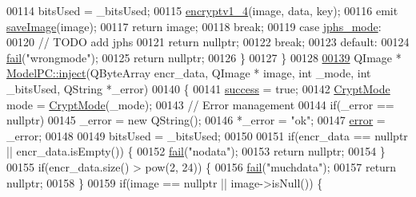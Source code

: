 \begin{DoxyCode}
00114             bitsUsed = \_bitsUsed;
00115             \hyperlink{class_model_p_c_a4daefc3fb87a1f19172b9b20c987eb12}{encryptv1\_4}(image, data, key);
00116             emit \hyperlink{class_model_p_c_a41f5e2e8022679046e4d3fa1109025fa}{saveImage}(image);
00117             \textcolor{keywordflow}{return} image;
00118         \textcolor{keywordflow}{break};
00119         \textcolor{keywordflow}{case} \hyperlink{class_model_p_c_a296dd7afe3e1c49b3da25fd644fe4ceba90ca32d3ccbb6be224cdfc33f7096eea}{jphs\_mode}:
00120             \textcolor{comment}{// TODO add jphs}
00121             \textcolor{keywordflow}{return} \textcolor{keyword}{nullptr};
00122         \textcolor{keywordflow}{break};
00123         \textcolor{keywordflow}{default}:
00124             \hyperlink{class_model_p_c_a47464b59b7e37fcee25e55475708aabd}{fail}(\textcolor{stringliteral}{"wrongmode"});
00125             \textcolor{keywordflow}{return} \textcolor{keyword}{nullptr};
00126     \}
00127 \}
00128 
\hypertarget{modelpc_8cpp_source.tex_l00139}{}\hyperlink{class_model_p_c_aada6a04d81ada8f2b4ba18108c8d6f10}{00139} QImage * \hyperlink{class_model_p_c_aada6a04d81ada8f2b4ba18108c8d6f10}{ModelPC::inject}(QByteArray encr\_data, QImage * image, \textcolor{keywordtype}{int} \_mode, \textcolor{keywordtype}{int} \_bitsUsed, 
      QString *\_error)
00140 \{
00141     \hyperlink{class_model_p_c_a945ffbbc44a832b953c191debd448f4c}{success} = \textcolor{keyword}{true};
00142     \hyperlink{class_model_p_c_a296dd7afe3e1c49b3da25fd644fe4ceb}{CryptMode} mode = \hyperlink{class_model_p_c_a296dd7afe3e1c49b3da25fd644fe4ceb}{CryptMode}(\_mode);
00143     \textcolor{comment}{// Error management}
00144     \textcolor{keywordflow}{if}(\_error == \textcolor{keyword}{nullptr})
00145         \_error = \textcolor{keyword}{new} QString();
00146     *\_error = \textcolor{stringliteral}{"ok"};
00147     \hyperlink{class_model_p_c_a4e5a9c0ca1f06fe5bc478b6bf248c37c}{error} = \_error;
00148 
00149     bitsUsed = \_bitsUsed;
00150 
00151     \textcolor{keywordflow}{if}(encr\_data == \textcolor{keyword}{nullptr} || encr\_data.isEmpty()) \{
00152         \hyperlink{class_model_p_c_a47464b59b7e37fcee25e55475708aabd}{fail}(\textcolor{stringliteral}{"nodata"});
00153         \textcolor{keywordflow}{return} \textcolor{keyword}{nullptr};
00154     \}
00155     \textcolor{keywordflow}{if}(encr\_data.size() > pow(2, 24)) \{
00156         \hyperlink{class_model_p_c_a47464b59b7e37fcee25e55475708aabd}{fail}(\textcolor{stringliteral}{"muchdata"});
00157         \textcolor{keywordflow}{return} \textcolor{keyword}{nullptr};
00158     \}
00159     \textcolor{keywordflow}{if}(image == \textcolor{keyword}{nullptr} || image->isNull()) \{

\end{DoxyCode}
